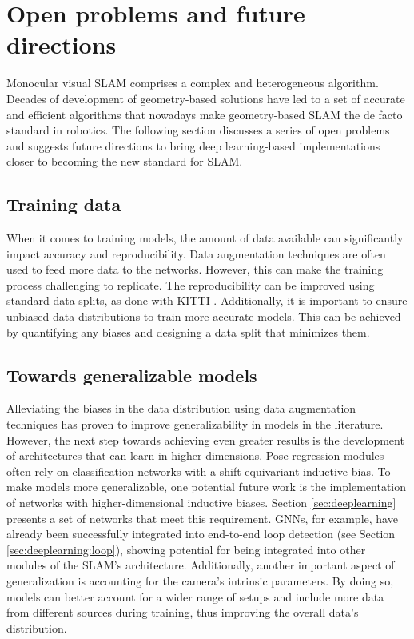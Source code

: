 \section{Open problems and future directions}
Monocular visual SLAM comprises a complex and heterogeneous algorithm. Decades of development of geometry-based solutions have led to a set of accurate and efficient algorithms that nowadays make geometry-based SLAM the de facto standard in robotics. The following section discusses a series of open problems and suggests future directions to bring deep learning-based implementations closer to becoming the new standard for SLAM.

\subsection{Training data}
\label{sec:futureworks:trainingdata}
When it comes to training models, the amount of data available can significantly impact accuracy and reproducibility. Data augmentation techniques are often used to feed more data to the networks. However, this can make the training process challenging to replicate. The reproducibility can be improved using standard data splits, as done with KITTI \cite{kittieigensplit}. Additionally, it is important to ensure unbiased data distributions to train more accurate models. This can be achieved by quantifying any biases and designing a data split that minimizes them.

\subsection{Towards generalizable models}
\label{sec:futureworks:generalizability}
Alleviating the biases in the data distribution using data augmentation techniques has proven to improve generalizability in models in the literature. However, the next step towards achieving even greater results is the development of architectures that can learn in higher dimensions.
Pose regression modules often rely on classification networks with a shift-equivariant inductive bias. To make models more generalizable, one potential future work is the implementation of networks with higher-dimensional inductive biases. Section \ref{sec:deeplearning} presents a set of networks that meet this requirement.
GNNs, for example, have already been successfully integrated into end-to-end loop detection (see Section \ref{sec:deeplearning:loop}), showing potential for being integrated into other modules of the SLAM's architecture. 
Additionally, another important aspect of generalization is accounting for the camera's intrinsic parameters. By doing so, models can better account for a wider range of setups and include more data from different sources during training, thus improving the overall data's distribution.

